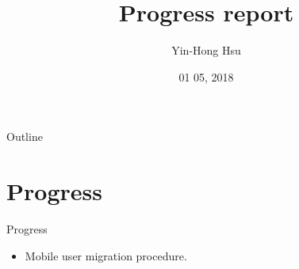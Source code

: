 \documentclass{beamer}
\title {
    Progress report
}
\author {
    Yin-Hong Hsu
}
\date {
    01 05, 2018
}
\begin{document}
\begin{frame}
    \titlepage
\end{frame}


\begin{frame}{Outline}
    \tableofcontentsgather
    \tableofcontents
\end{frame}

\section{Progress}
\begin{frame} {Progress} 
    \begin{itemize}
        \item {Mobile user migration procedure.}
        
    \end{itemize}
\end{frame}
\end{document}

